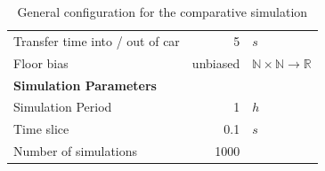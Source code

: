 \begin{table}[]
\begin{tabular}{lrl}
Transfer time into / out of car & 5 & $s$\\
Floor bias & unbiased & $ \mathbb{N} \times \mathbb{N} \rightarrow \mathbb{R} $ \\
\hline
\multicolumn{3}{l}{\textbf{Simulation Parameters}}\\
Simulation Period & 1 & $h$\\
Time slice & 0.1 & $s$\\
Number of simulations & 1000 & \\
\end{tabular}
\caption{\label{tab:design:simulationconfig} General configuration for the comparative simulation}
\end{table}

\begingroup
\renewcommand*{\arraystretch}{1.0}
\begin{table}[]
\centering
{}
\caption{\label{tab:design:trafficitemprototypes} Prototypes for traffic items in the simulation}
\end{table}
\endgroup

